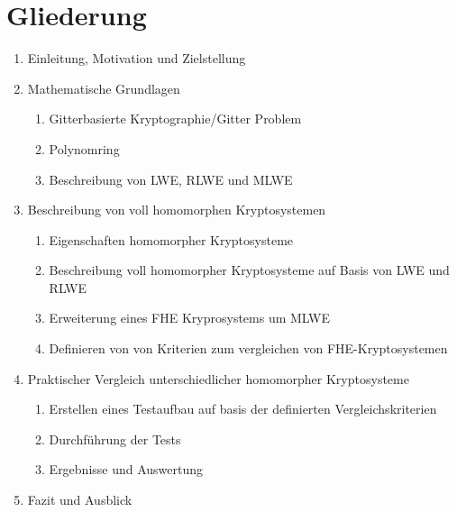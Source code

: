 \chapter{Gliederung}
\label{Grob-Gliederung}

\begin{enumerate}
  \item Einleitung, Motivation und Zielstellung
  \item Mathematische Grundlagen
        \begin{enumerate}
          \item Gitterbasierte Kryptographie/Gitter Problem
          \item Polynomring
          \item Beschreibung von LWE, RLWE und MLWE
        \end{enumerate}
  \item Beschreibung von voll homomorphen Kryptosystemen
        \begin{enumerate}
          \item Eigenschaften homomorpher Kryptosysteme
          \item Beschreibung voll homomorpher Kryptosysteme auf Basis von LWE und RLWE
          \item Erweiterung eines FHE Kryprosystems um MLWE
          \item Definieren von von Kriterien zum vergleichen von FHE-Kryptosystemen
        \end{enumerate}
  \item Praktischer Vergleich unterschiedlicher homomorpher Kryptosysteme
        \begin{enumerate}
          \item Erstellen eines Testaufbau auf basis der definierten Vergleichskriterien
          \item Durchführung der Tests
          \item Ergebnisse und Auswertung
        \end{enumerate}
  \item Fazit und Ausblick
\end{enumerate}

